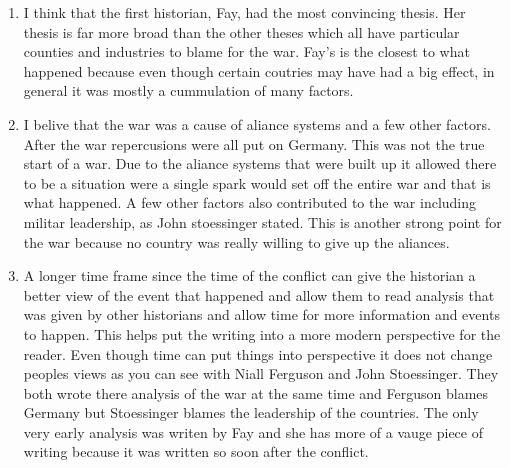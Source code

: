 \documentclass[12pt]{article}
\begin{document}
\begin{enumerate}
  \item I think that the first historian, Fay, had the most convincing thesis. Her thesis is far more broad than the other theses which all have particular counties and industries to blame for the war. Fay's is the closest to what happened because even though certain coutries may have had a big effect, in general it was mostly a cummulation of many factors.
  \item I belive that the war was a cause of aliance systems and a few other factors. After the war repercusions were all put on Germany. This was not the true start of a war. Due to the aliance systems that were built up it allowed there to be a situation were a single spark would set off the entire war and that is what happened. A few other factors also contributed to the war including militar leadership, as John stoessinger stated. This is another strong point for the war because no country was really willing to give up the aliances.
  \item A longer time frame since the time of the conflict can give the historian a better view of the event that happened and allow them to read analysis that was given by other historians and allow time for more information and events to happen. This helps put the writing into a more modern perspective for the reader. Even though time can put things into perspective it does not change peoples views as you can see with Niall Ferguson and John Stoessinger. They both wrote there analysis of the war at the same time and Ferguson blames Germany but Stoessinger blames the leadership of the countries. The only very early analysis was writen by Fay and she has more of a vauge piece of writing because it was written so soon after the conflict.
\end{enumerate}
\end{document}
